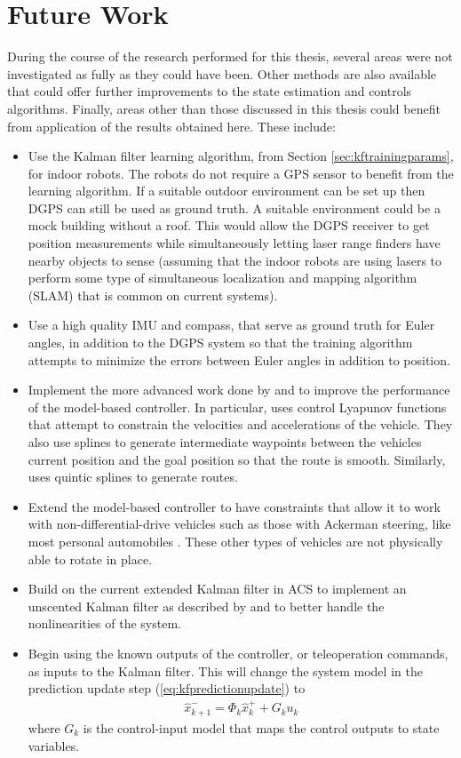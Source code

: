 \section{Future Work}
\label{sec:futureWork}
During the course of the research performed for this thesis, several areas were not investigated as fully as they could have been. Other methods are also available that could offer further improvements to the state estimation and controls algorithms. Finally, areas other than those discussed in this thesis could benefit from application of the results obtained here. These include:
\begin{itemize}
\item Use the Kalman filter learning algorithm, from Section \ref{sec:kftrainingparams}, for indoor robots. The robots do not require a GPS sensor to benefit from the learning algorithm. If a suitable outdoor environment can be set up then DGPS can still be used as ground truth. A suitable environment could be a mock building without a roof. This would allow the DGPS receiver to get position measurements while simultaneously letting laser range finders have nearby objects to sense (assuming that the indoor robots are using lasers to perform some type of simultaneous localization and mapping algorithm (SLAM) that is common on current systems).
\item Use a high quality IMU and compass, that serve as ground truth for Euler angles, in addition to the DGPS system so that the training algorithm attempts to minimize the errors between Euler angles in addition to position.
\item Implement the more advanced work done by \cite{Lapierre06} and \cite{Gulati08} to improve the performance of the model-based controller. In particular, \cite{Gulati08} uses control Lyapunov functions that attempt to constrain the velocities and accelerations of the vehicle. They also use splines to generate intermediate waypoints between the vehicles current position and the goal position so that the route is smooth. Similarly, \cite{Burgard09} uses quintic splines to generate routes.
\item Extend the model-based controller to have constraints that allow it to work with non-differential-drive vehicles such as those with Ackerman steering, like most personal automobiles \cite{Shiller91dynamicmotion}. These other types of vehicles are not physically able to rotate in place.
\item Build on the current extended Kalman filter in ACS to implement an unscented Kalman filter as described by \cite{ThrunProbRobots06} and \cite{Orderud05} to better handle the nonlinearities of the system.
\item Begin using the known outputs of the controller, or teleoperation commands, as inputs to the Kalman filter. This will change the system model in the prediction update step (\ref{eq:kfpredictionupdate}) to
\begin{align*}
\hat{x}_{k+1}^- = \Phi_k \hat{x}_k^+ + G_ku_k
\end{align*}
where $G_k$ is the control-input model that maps the control outputs to state variables.
\end{itemize}
